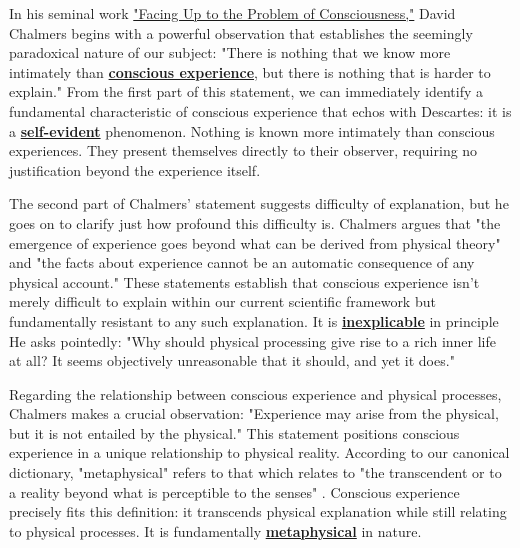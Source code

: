 \documentclass[runningheads]{llncs}
\begin{document}
In his seminal work \href{http://consc.net/papers/facing.pdf}{"Facing Up to the Problem of Consciousness,"}\xspace David Chalmers begins with a powerful observation that establishes the seemingly paradoxical nature of our subject: "There is nothing that we know more intimately than \href{https://dna-platform.github.io/inexplicable-phenomena/dictionary/conscious-experience.html}{\textbf{conscious experience}}\xspace, but there is nothing that is harder to explain." From the first part of this statement, we can immediately identify a fundamental characteristic of conscious experience that echos with Descartes: it is a \href{https://dna-platform.github.io/inexplicable-phenomena/dictionary/self-evident.html}{\textbf{self-evident}}\xspace phenomenon. Nothing is known more intimately than conscious experiences. They present themselves directly to their observer, requiring no justification beyond the experience itself.

The second part of Chalmers' statement suggests difficulty of explanation, but he goes on to clarify just how profound this difficulty is. Chalmers argues that "the emergence of experience goes beyond what can be derived from physical theory" and "the facts about experience cannot be an automatic consequence of any physical account." These statements establish that conscious experience isn't merely difficult to explain within our current scientific framework but fundamentally resistant to any such explanation. It is \href{https://dna-platform.github.io/inexplicable-phenomena/dictionary/inexplicable.html}{\textbf{inexplicable}}\xspace in principle He asks pointedly: "Why should physical processing give rise to a rich inner life at all? It seems objectively unreasonable that it should, and yet it does."

Regarding the relationship between conscious experience and physical processes, Chalmers makes a crucial observation: "Experience may arise from the physical, but it is not entailed by the physical." This statement positions conscious experience in a unique relationship to physical reality. According to our canonical dictionary, "metaphysical" refers to that which relates to "the transcendent or to a reality beyond what is perceptible to the senses" \cite{DictionaryMV}. Conscious experience precisely fits this definition: it transcends physical explanation while still relating to physical processes. It is fundamentally \href{https://dna-platform.github.io/inexplicable-phenomena/dictionary/metaphysical.html}{\textbf{metaphysical}}\xspace in nature.
\end{document}
